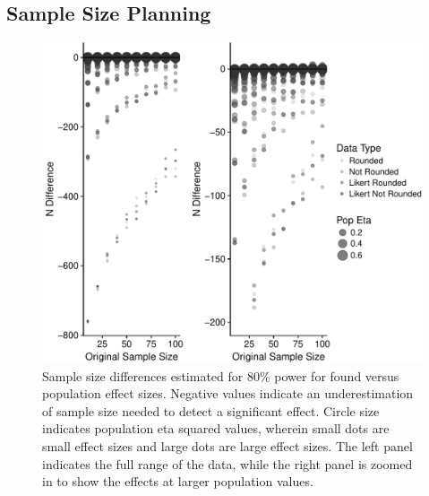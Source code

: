 \documentclass[english,man]{apa6}
\theoremstyle{definition}
\theoremstyle{definition}
\theoremstyle{definition}
\theoremstyle{remark}
\begin{document}
\subsection{Sample Size Planning}\label{sample-size-planning}

\begin{figure}[htbp]
\centering
\includegraphics{buchanan_scofield_files/figure-latex/powerL-graph-1.pdf}
\caption{\label{fig:powerL-graph}Sample size differences estimated for 80\%
power for found versus population effect sizes. Negative values indicate
an underestimation of sample size needed to detect a significant effect.
Circle size indicates population eta squared values, wherein small dots
are small effect sizes and large dots are large effect sizes. The left
panel indicates the full range of the data, while the right panel is
zoomed in to show the effects at larger population values.}
\end{figure}
\end{document}
